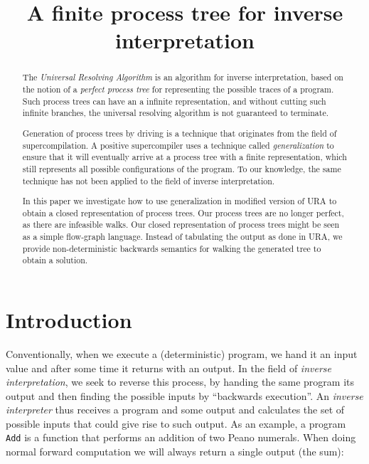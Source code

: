 \documentclass[10pt]{../sigplanconf}
\title{A finite process tree for inverse interpretation}
\begin{document}
\maketitle

\begin{abstract}
  The \textit{Universal Resolving
    Algorithm} \cite{abramov2000universal} is an algorithm for inverse
  interpretation, based on the notion of a \textit{perfect process
    tree} \cite{gluck1993occam} for representing the possible traces
  of a program. Such process trees can have an a infinite
  representation, and without cutting such infinite branches, the
  universal resolving algorithm is not guaranteed to terminate.

  Generation of process trees by driving is a technique that
  originates from the field of
  supercompilation\cite{sorensen1998introduction}. A positive
  supercompiler uses a technique called \emph{generalization} to
  ensure that it will eventually arrive at a process tree with a
  finite representation, which still represents all possible
  configurations of the program. To our knowledge, the same technique
  has not been applied to the field of inverse interpretation.

  In this paper we investigate how to use generalization in modified
  version of URA to obtain a closed representation of process
  trees. Our process trees are no longer perfect, as there are
  infeasible walks. Our closed representation of process trees might
  be seen as a simple flow-graph language. Instead of tabulating the
  output as done in URA, we provide non-deterministic backwards
  semantics for walking the generated tree to obtain a solution.
\end{abstract}




\section{Introduction}
Conventionally, when we execute a (deterministic) program, we hand it
an input value and after some time it returns with an output. In the
field of \textit{inverse interpretation}, we seek to reverse this
process, by handing the same program its output and then finding the
possible inputs by ``backwards execution''. An \textit{inverse
  interpreter} thus receives a program and some output and calculates
the set of possible inputs that could give rise to such output. As an
example, a program \texttt{Add} is a function that performs an
addition of two Peano numerals. When doing normal forward computation
we will always return a single output (the sum):\\
\end{document}
